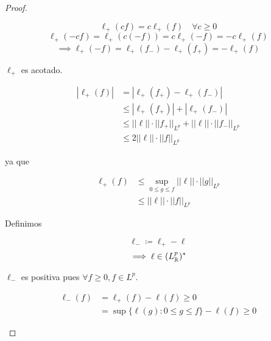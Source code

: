 \begin{proof}
\begin{enumerate}
        \[\ell_+(cf)=c\ell_+(f)\quad\forall c\geq 0\]
        \[\ell_+(-cf)=\ell_+(c(-f))=c\ell_+(-f)=-c\ell_+(f)\]
        \[\implies \ell_+(-f)=\ell_+(f_-)-\ell_+(f_+)=-\ell_+(f)\]

        $\ell_+$ es acotado.

        \begin{align*}
            |\ell_+(f)|&=|\ell_+(f_+)-\ell_+(f_-)|\\
            &\leq |\ell_+(f_+)|+|\ell_+(f_-)|\\
            &\leq ||\ell||\cdot||f_+||_{L^p}+||\ell||\cdot||f_-||_{L^p}\\
            &\leq 2||\ell||\cdot||f||_{L^p}
        \end{align*}

        ya que

        \begin{align*}
            \ell_+(f)&\leq \sup_{0\leq g\leq f}||\ell||\cdot||g||_{L^p}\\
            &\leq ||\ell||\cdot ||f||_{L^p}
        \end{align*}

        Definimos 

        \[\ell_-\coloneqq \ell_+-\ell\]
        \[\implies \ell \in (L^p_{\mathbb{R}})^*\]

        $\ell_-$ es positiva pues $\forall f\geq 0,f\in L^p$.

        \begin{align*}
            \ell_-(f)&=\ell_+(f)-\ell(f)\geq 0\\
            &=\sup\{\ell(g):0\leq g\leq f\}-\ell(f)\geq 0
        \end{align*}
    \end{enumerate}
\end{proof}

